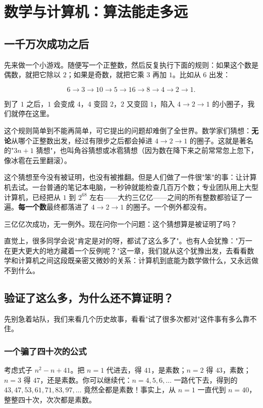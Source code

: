 \chapter{数学与计算机：算法能走多远}

\section{一千万次成功之后}

先来做一个小游戏。随便写一个正整数，然后反复执行下面的规则：如果这个数是偶数，就把它除以 $2$；如果是奇数，就把它乘 $3$ 再加 $1$。比如从 $6$ 出发：

\[6 \to 3 \to 10 \to 5 \to 16 \to 8 \to 4 \to 2 \to 1.\]

到了 $1$ 之后，$1$ 会变成 $4$，$4$ 变回 $2$，$2$ 又变回 $1$，陷入 $4 \to 2 \to 1$ 的小圈子，我们就停在这里。

这个规则简单到不能再简单，可它提出的问题却难倒了全世界。数学家们猜想：\textbf{无论}从哪个正整数出发，经过有限步之后都会掉进 $4 \to 2 \to 1$ 的圈子。这就是著名的"$3n+1$ 猜想"，也叫角谷猜想或冰雹猜想（因为数在降下来之前常常忽上忽下，像冰雹在云里翻滚）。

这个猜想至今没有被证明，也没有被推翻。但是人们做了一件很"笨"的事：让计算机去试。一台普通的笔记本电脑，一秒钟就能检查几百万个数；专业团队用上大型计算机，已经把从 $1$ 到 $2^{68}$ 左右——大约三亿亿——之间的所有整数都验证了一遍。\textbf{每一个数}最终都落进了 $4 \to 2 \to 1$ 的圈子。一个例外都没有。

三亿亿次成功，无一例外。现在问你一个问题：这个猜想算是被证明了吗？

直觉上，很多同学会说"肯定是对的呀，都试了这么多了"。也有人会犹豫："万一在更大更大的地方藏着一个反例呢？"这一章，我们就从这个犹豫出发，去看看数学和计算机之间这段既亲密又微妙的关系：计算机到底能为数学做什么，又永远做不到什么。

\section{验证了这么多，为什么还不算证明？}

先别急着站队，我们来看几个历史故事，看看"试了很多次都对"这件事有多么靠不住。

\subsection{一个骗了四十次的公式}

考虑式子 $n^2 - n + 41$。把 $n=1$ 代进去，得 $41$，是素数；$n=2$ 得 $43$，素数；$n=3$ 得 $47$，还是素数。你可以继续代：$n=4,5,6,\dots$ 一路代下去，得到的 $43,47,53,61,71,83,97,\dots$ 竟然全都是素数！事实上，从 $n=1$ 一直代到 $n=40$，整整四十次，次次都是素数。

